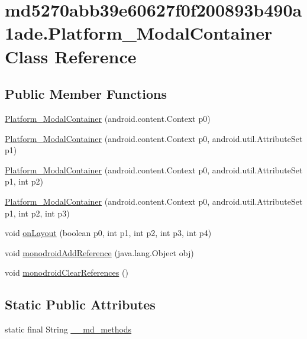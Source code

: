 \hypertarget{classmd5270abb39e60627f0f200893b490a1ade_1_1_platform___modal_container}{
\section{md5270abb39e60627f0f200893b490a1ade.Platform\_\-ModalContainer Class Reference}
\label{classmd5270abb39e60627f0f200893b490a1ade_1_1_platform___modal_container}
}
\subsection*{Public Member Functions}
\begin{CompactItemize}
\item 
\hyperlink{classmd5270abb39e60627f0f200893b490a1ade_1_1_platform___modal_container_92a10110c5163250038b70eac72edf9c}{Platform\_\-ModalContainer} (android.content.Context p0)
\item 
\hyperlink{classmd5270abb39e60627f0f200893b490a1ade_1_1_platform___modal_container_7902058e4fdbac267c6743c1b4d61fa1}{Platform\_\-ModalContainer} (android.content.Context p0, android.util.AttributeSet p1)
\item 
\hyperlink{classmd5270abb39e60627f0f200893b490a1ade_1_1_platform___modal_container_65fa53ddac943e43d486ad88b1f799f5}{Platform\_\-ModalContainer} (android.content.Context p0, android.util.AttributeSet p1, int p2)
\item 
\hyperlink{classmd5270abb39e60627f0f200893b490a1ade_1_1_platform___modal_container_a1bbc21be7a4fa6c380204d67db4c391}{Platform\_\-ModalContainer} (android.content.Context p0, android.util.AttributeSet p1, int p2, int p3)
\item 
void \hyperlink{classmd5270abb39e60627f0f200893b490a1ade_1_1_platform___modal_container_20efd00b191e1b55e8d67cfe214aa46e}{onLayout} (boolean p0, int p1, int p2, int p3, int p4)
\item 
void \hyperlink{classmd5270abb39e60627f0f200893b490a1ade_1_1_platform___modal_container_d613a79affc6cde31a12e95b9b2f051a}{monodroidAddReference} (java.lang.Object obj)
\item 
void \hyperlink{classmd5270abb39e60627f0f200893b490a1ade_1_1_platform___modal_container_552d05eeda2de9e27a1186fb70663ddd}{monodroidClearReferences} ()
\end{CompactItemize}
\subsection*{Static Public Attributes}
\begin{CompactItemize}
\item 
static final String \hyperlink{classmd5270abb39e60627f0f200893b490a1ade_1_1_platform___modal_container_43ca49e3a86d594a515e295f1356f624}{\_\-\_\-md\_\-methods}
\end{CompactItemize}
